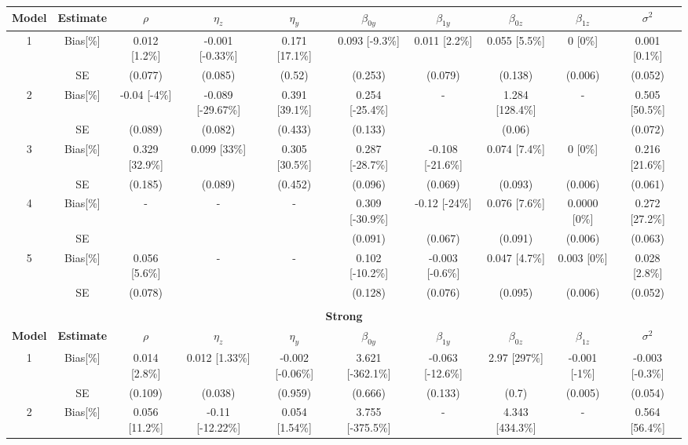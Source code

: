 \documentclass[12pt, a4paper, twoside]{article}
\begin{document}
\begin{sidewaystable}
\begin{table}[H]
{\begin{tabular}{|c||c||c||c||c||c||c||c||c||c|}
				\hline
				\textbf{Model} &\textbf{Estimate} & \textbf{$\rho$}& \textbf{$\eta_z$} & \textbf{$\eta_y$}& \textbf{$\beta_{0y}$}& \textbf{$\beta_{1y}$}& \textbf{$\beta_{0z}$}& \textbf{$\beta_{1z}$}& \textbf{$\sigma^2$}\\
				\hline
				1 &Bias[\%] & 0.012 [1.2\%] & -0.001 [-0.33\%] & 0.171 [17.1\%] & 0.093 [-9.3\%] & 0.011 [2.2\%] & 0.055 [5.5\%] & 0 [0\%] & 0.001 [0.1\%] \\ 
				&SE& (0.077) & (0.085) & (0.52) & (0.253) & (0.079) & (0.138) & (0.006) & (0.052) \\  \hline
				2 &Bias[\%]& -0.04 [-4\%] & -0.089 [-29.67\%] & 0.391 [39.1\%] & 0.254 [-25.4\%] & -  & 1.284 [128.4\%] & - & 0.505 [50.5\%] \\ 
				& SE& (0.089) & (0.082) & (0.433) & (0.133) & & (0.06) & & (0.072) \\   
				\hline
				3 &Bias[\%]& 0.329 [32.9\%] & 0.099 [33\%] & 0.305 [30.5\%] & 0.287 [-28.7\%] & -0.108 [-21.6\%] & 0.074 [7.4\%] & 0 [0\%] & 0.216 [21.6\%] \\ 
				&SE& (0.185) & (0.089) & (0.452) & (0.096) & (0.069) & (0.093) & (0.006) & (0.061) \\\hline
				4 &Bias[\%]& - & - & -& 0.309 [-30.9\%] & -0.12 [-24\%] & 0.076 [7.6\%] & 0.0000 [0\%] & 0.272 [27.2\%] \\ 
				&SE& & & & (0.091) & (0.067) & (0.091) & (0.006) & (0.063) \\  \hline
				5 &Bias[\%] & 0.056 [5.6\%] & - & - & 0.102 [-10.2\%] & -0.003 [-0.6\%] & 0.047 [4.7\%] & 0.003 [0\%] & 0.028 [2.8\%] \\ 
				&SE & (0.078) & & & (0.128) & (0.076) & (0.095) & (0.006) & (0.052) \\  
				\hline
				\multicolumn{10}{|c|}{} \\
				\multicolumn{10}{|c|}{\textbf{Strong}} \\
				\hline
				\textbf{Model} & \textbf{Estimate} &\textbf{$\rho$}& \textbf{$\eta_z$} & \textbf{$\eta_y$}& \textbf{$\beta_{0y}$}& \textbf{$\beta_{1y}$}& \textbf{$\beta_{0z}$}& \textbf{$\beta_{1z}$}& \textbf{$\sigma^2$}\\
				\hline
				1 &Bias[\%] & 0.014 [2.8\%] & 0.012 [1.33\%] & -0.002 [-0.06\%] & 3.621 [-362.1\%] & -0.063 [-12.6\%] & 2.97 [297\%] & -0.001 [-1\%] & -0.003 [-0.3\%] \\  
				&SE& (0.109) & (0.038) & (0.959) & (0.666) & (0.133) & (0.7) & (0.005) & (0.054) \\   \hline
				2 &Bias[\%]& 0.056 [11.2\%] & -0.11 [-12.22\%] & 0.054 [1.54\%] & 3.755 [-375.5\%] & - & 4.343 [434.3\%] & - & 0.564 [56.4\%] \\

\end{tabular}}
\end{table}
\end{sidewaystable}
\end{document}
